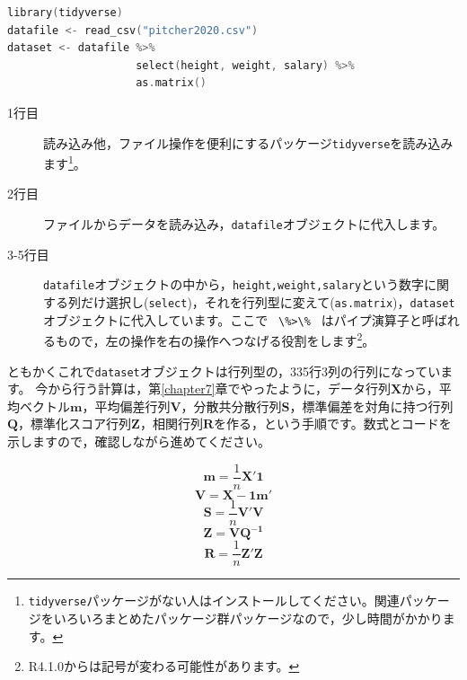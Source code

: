 \documentclass{ltjsbook}
\begin{document}
\begin{lstlisting}[language=c++,label={code::09_05},caption={データファイルの読み込み}]
library(tidyverse)
datafile <- read_csv("pitcher2020.csv")
dataset <- datafile %>%
                    select(height, weight, salary) %>%
                    as.matrix()
\end{lstlisting}
\begin{description}
        \item[1行目] 読み込み他，ファイル操作を便利にするパッケージ\texttt{tidyverse}を読み込みます\footnote{\texttt{tidyverse}パッケージがない人はインストールしてください。関連パッケージをいろいろまとめたパッケージ群パッケージなので，少し時間がかかります。}。
        \item[2行目] ファイルからデータを読み込み，\texttt{datafile}オブジェクトに代入します。
        \item[3-5行目] \texttt{datafile}オブジェクトの中から，\texttt{height,weight,salary}という数字に関する列だけ選択し(\texttt{select})，それを行列型に変えて(\texttt{as.matrix})，\texttt{dataset}オブジェクトに代入しています。ここで
         \verb| \%>\% | はパイプ演算子と呼ばれるもので，左の操作を右の操作へつなげる役割をします\footnote{R4.1.0からは記号が変わる可能性があります。}。
\end{description}

ともかくこれで\texttt{dataset}オブジェクトは行列型の，335行3列の行列になっています。
今から行う計算は，第\ref{chapter7}章でやったように，データ行列$\bm{X}$から，平均ベクトル$\bm{m}$，平均偏差行列$\bm{V}$，分散共分散行列$\bm{S}$，標準偏差を対角に持つ行列$\bm{Q}$，標準化スコア行列$\bm{Z}$，相関行列$\bm{R}$を作る，という手順です。数式とコードを示しますので，確認しながら進めてください。

\begin{equation}\label{meanM} \bm{m} = \frac{1}{n}\bm{X'1} \end{equation}
\begin{equation}\label{diffV} \bm{V} = \bm{X}-\bm{1m'} \end{equation}
\begin{equation}\label{covS} \bm{S} = \frac{1}{n}\bm{V'V} \end{equation}
\begin{equation}\label{stdZ} \bm{Z} = \bm{VQ^{-1}} \end{equation}
\begin{equation}\label{corR} \bm{R} = \frac{1}{n}\bm{Z'Z} \end{equation}
\end{document}

